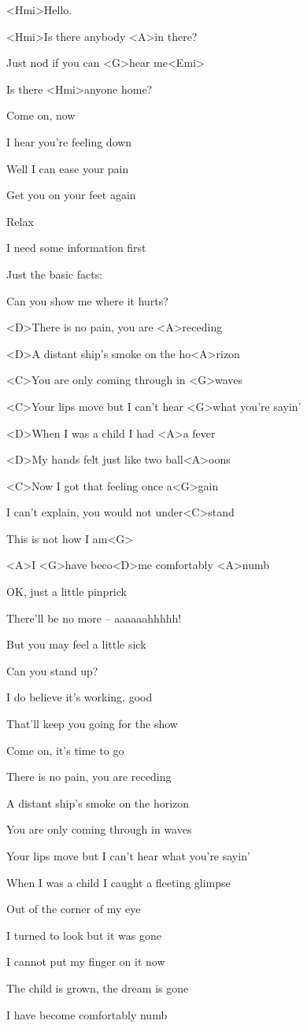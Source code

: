
\zs
<Hmi>Hello.

<Hmi>Is there anybody <A>in there? 

Just nod if you can <G>hear me<Emi>

Is there <Hmi>anyone home?
\ks

\zs
Come on, now

I hear you’re feeling down

Well I can ease your pain

Get you on your feet again
\ks

\zs
Relax

I need some information first

Just the basic facts:

Can you show me where it hurts? 
\ks

\zr
<D>There is no pain, you are <A>receding

<D>A distant ship’s smoke on the ho<A>rizon

<C>You are only coming through in <G>waves

<C>Your lips move but I can’t hear <G>what you’re sayin’

<D>When I was a child I had <A>a fever

<D>My hands felt just like two ball<A>oons

<C>Now I got that feeling once a<G>gain

I can’t explain, you would not under<C>stand

This is not how I am<G>

<A>I <G>have beco<D>me comfortably <A>numb
\kr

\zs
OK,
just a little pinprick

There’ll be no more -- aaaaaahhhhh!

But you may feel a little sick
\ks

\zs
Can you stand up? 

I do believe it’s working, good

That’ll keep you going for the show

Come on, it’s time to go
\ks

\zr
There is no pain, you are receding

A distant ship’s smoke on the horizon

You are only coming through in waves

Your lips move but I can’t hear what you’re sayin’

When I was a child I caught a fleeting glimpse

Out of the corner of my eye

I turned to look but it was gone

I cannot put my finger on it now

The child is grown, the dream is gone

I have become comfortably numb
\kr
\kp
